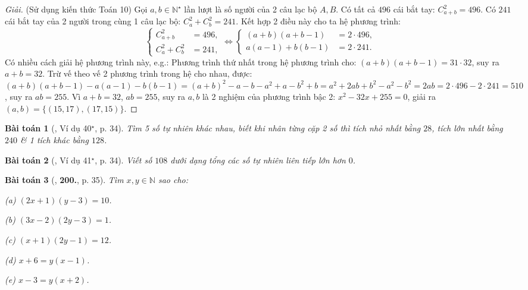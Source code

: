 \documentclass{article}
\numberwithin{equation}{section}
\newtheorem{baitoan}{Bài toán}[section]
\begin{document}
\begin{proof}[Giải]
	(Sử dụng kiến thức Toán 10) Gọi $a,b\in\mathbb{N}^\star$ lần lượt là số người của 2 câu lạc bộ $A,B$. Có tất cả $496$ cái bắt tay: $C_{a+b}^2 = 496$. Có $241$ cái bắt tay của 2 người trong cùng 1 câu lạc bộ: $C_a^2 + C_b^2 = 241$. Kết hợp 2 điều này cho ta hệ phương trình:
	\begin{equation*}
		\left\{\begin{split}
			C_{a+b}^2 &= 496,\\
			C_a^2 + C_b^2 &= 241,
		\end{split}\right.\Leftrightarrow\left\{\begin{split}
			(a + b)(a + b - 1) &= 2\cdot 496,\\
			a(a - 1) + b(b - 1) &= 2\cdot 241.
		\end{split}\right.
	\end{equation*}
	Có nhiều cách giải hệ phương trình này, e.g.: Phương trình thứ nhất trong hệ phương trình cho: $(a + b)(a + b - 1) = 31\cdot 32$, suy ra $a + b = 32$. Trừ vế theo vế 2 phương trình trong hệ cho nhau, được: $(a + b)(a + b - 1) - a(a - 1) - b(b - 1) = (a + b)^2 - a - b - a^2 + a - b^2 + b = a^2 + 2ab + b^2 - a^2 - b^2 = 2ab = 2\cdot496 - 2\cdot241 = 510$, suy ra $ab = 255$. Vì $a + b = 32$, $ab = 255$, suy ra $a,b$ là 2 nghiệm của phương trình bậc 2: $x^2 - 32x + 255 = 0$, giải ra $(a,b) = \{(15,17),(17,15)\}$.
\end{proof}

\begin{baitoan}[\cite{Binh_Toan_6_tap_1}, Ví dụ 40${}^\star$, p. 34]
	Tìm 5 số tự nhiên khác nhau, biết khi nhân từng cặp 2 số thì tích nhỏ nhất bằng $28$, tích lớn nhất bằng $240$ \& 1 tích khác bằng $128$.
\end{baitoan}

\begin{baitoan}[\cite{Binh_Toan_6_tap_1}, Ví dụ 41${}^\star$, p. 34]
	Viết số $108$ dưới dạng tổng các số tự nhiên liên tiếp lớn hơn $0$.
\end{baitoan}

\begin{baitoan}[\cite{Binh_Toan_6_tap_1}, \textbf{200.}, p. 35]
	Tìm $x,y\in\mathbb{N}$ sao cho:
	\begin{enumerate*}
		\item[(a)] $(2x + 1)(y - 3) = 10$.
		\item[(b)] $(3x - 2)(2y - 3) = 1$.
		\item[(c)] $(x + 1)(2y - 1) = 12$.
		\item[(d)] $x + 6 = y(x - 1)$.
		\item[(e)] $x - 3 = y(x + 2)$.
	\end{enumerate*}
\end{baitoan}
\end{document}
